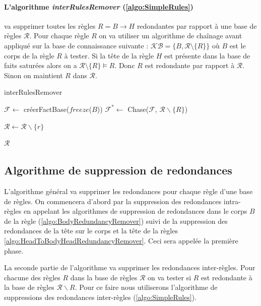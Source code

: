 \paragraph{L'algorithme \textit{interRulesRemover} (\ref{algo:SimpleRules})} va supprimer toutes les règles $R = B \rightarrow H$ redondantes par rapport à une base de règles $\mathcal{R}$. Pour chaque règle $R$ on va utiliser un algorithme de chaînage avant appliqué sur la base de connaissance suivante : $\mathcal{KB} = \{B, \mathcal{R} \setminus \{R\}\} $ où $B$ est le corps de la règle $R$ à tester. Si la tête de la règle $H$ est présente dans la base de faits saturées alors on a $\mathcal{R} \setminus \{R\} \models R$. Donc $R$ est redondante par rapport à $\mathcal{R}$. Sinon on maintient $R$ dans $\mathcal{R}$. 
\newline



\begin{algorithm}[H]\label{algo:SimpleRules}
\caption{interRulesRemover} %
\SetAlgoLined
\DontPrintSemicolon
\SetAlgoLined
\DontPrintSemicolon
{}
    {
         $\mathcal{F} \gets$ créerFactBase($freeze$($B$)) 
         $\mathcal{F}^* \gets$ Chase($\mathcal{F}$, $\mathcal{R} \backslash \{R\}$)\;
         
        {
            $\mathcal{R} \gets \mathcal{R} \backslash \{r\}$\;
        }
    }
    \Return $\mathcal{R}$
\end{algorithm}



\subsection{Algorithme de suppression de redondances}\label{sec:algo-regles}

\par L'algorithme général va supprimer les redondances pour chaque règle d'une base de règles. On commencera d'abord par la suppression des redondances intra-règles en appelant les algorithmes de suppression de redondances dans le corps $B$ de la règle (\ref{algo:BodyRedundancyRemover}) suivi de la suppression des redondances de la tête sur le corps et la tête de la règles \ref{algo:HeadToBodyHeadRedundancyRemover}. Ceci sera appelée la première phase. 
\par La seconde partie de l'algorithme va supprimer les redondances inter-règles. Pour chacune des règles $R$ dans la base de règles $\mathcal{R}$ on va tester si $R$ est redondante à la base de règles $\mathcal{R} \backslash {R}$. Pour ce faire nous utiliserons l'algorithme de suppressions des redondances inter-règles (\ref{algo:SimpleRules}).

